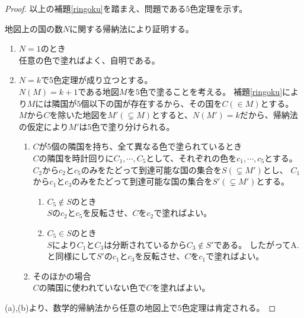 \documentclass{jsarticle}
\begin{document}
\begin{enumerate}
\begin{proof}
以上の補題\ref{ringoku}を踏まえ、問題である$5$色定理を示す。

地図上の国の数$N$に関する帰納法により証明する。
\begin{enumerate}
\item $ N = 1 $のとき\\
任意の色で塗ればよく、自明である。
\item $ N = k $で5色定理が成り立つとする。\\
$ N(M) = k + 1 $である地図$M$を$5$色で塗ることを考える。
補題\ref{ringoku}により$M$には隣国が$5$個以下の国が存在するから、その国を$C(\in M)$とする。
$M$から$C$を除いた地図を$M'(\subsetneq M)$とすると、$ N(M') = k $だから、帰納法の仮定により$M'$は$5$色で塗り分けられる。
\begin{enumerate}
\item $C$が5個の隣国を持ち、全て異なる色で塗られているとき\\
$C$の隣国を時計回りに$C_1,\cdots,C_5$として、それぞれの色を$c_1,\cdots,c_5$とする。
$C_2$から$c_2$と$c_5$のみをたどって到達可能な国の集合を$S(\subsetneq M')$とし、
$C_1$から$c_1$と$c_3$のみをたどって到達可能な国の集合を$S'(\subsetneq M')$とする。
\begin{enumerate}
\item $C_5\notin S$のとき\\
$S$の$c_2$と$c_5$を反転させ、$C$を$c_2$で塗ればよい。
\item $C_5\in S$のとき\\
$S$により$C_1$と$C_3$は分断されているから$C_3\notin S'$である。
したがってA.と同様にして$S'$の$c_1$と$c_3$を反転させ、$C$を$c_1$で塗ればよい。
\end{enumerate}
\item そのほかの場合\\
$C$の隣国に使われていない色で$C$を塗ればよい。\\
\end{enumerate}
\end{enumerate}
(a),(b)より、数学的帰納法から任意の地図上で$5$色定理は肯定される。
\end{proof}


\end{enumerate}
\end{document}
